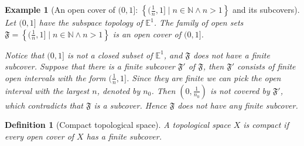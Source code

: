 \documentclass[onecolumn]{ctexart}
\newtheorem{definition}{Definition}
\newtheorem{example}{Example}
\begin{document}
\begin{example}[An open cover of $\lparen 0, 1 \rbrack$: $\left\{ \lparen \frac{1}{n}, 1 \rbrack \mid n \in \mathbb{N} \wedge n > 1 \right\}$ and its subcovers]
  Let $\lparen 0, 1 \rbrack$ have the subspace topology of $\mathbb{E}^1$. The family of open sets $\mathfrak{F} = \left\{ \lparen \frac{1}{n}, 1 \rbrack \mid n \in \mathbb{N} \wedge n > 1 \right\}$ is an open cover of $\lparen 0, 1 \rbrack$.

  Notice that $\lparen 0, 1 \rbrack$ is not a closed subset of $\mathbb{E}^1$, 
  and $\mathfrak{F}$ does not have a finite subcover. Suppose that there is a 
  finite subcover $\mathfrak{F}'$ of $\mathfrak{F}$, then $\mathfrak{F}'$ consists 
  of finite open intervals with the form $\lparen \frac{1}{n}, 1 \rbrack$. Since 
  they are finite we can pick the open interval with the largest $n$, denoted by 
  $n_0$. Then $(0, \frac{1}{n_0})$ is not covered by $\mathfrak{F}'$, which 
  contradicts that $\mathfrak{F}$ is a subcover. Hence $\mathfrak{F}$ does not 
  have any finite subcover.
\end{example}

\begin{definition}[Compact topological space]
  A topological space $X$ is compact if every open cover of $X$ has a finite 
  subcover.
\end{definition}
\end{document}
